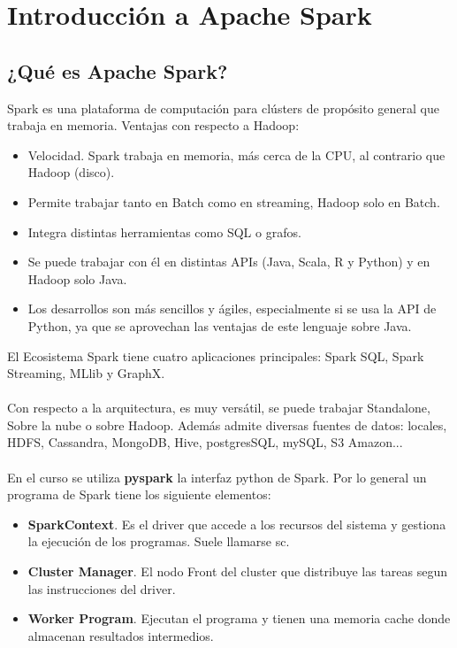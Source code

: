 \section{Introducción a Apache Spark}
\subsection{¿Qué es Apache Spark?}
Spark es una plataforma de computación para clústers de propósito general que trabaja en memoria.
Ventajas con respecto a Hadoop:
\begin{itemize}
	\item Velocidad. Spark trabaja en memoria, más cerca de la CPU, al contrario que Hadoop (disco).
	\item Permite trabajar tanto en Batch como en streaming, Hadoop solo en Batch.
	\item Integra distintas herramientas como SQL o grafos.
	\item Se puede trabajar con él en distintas APIs (Java, Scala, R y Python) y en Hadoop solo Java.
	\item Los desarrollos son más sencillos y ágiles, especialmente si se usa la API de Python, ya que se aprovechan las ventajas de este lenguaje sobre Java.
\end{itemize}
El Ecosistema Spark tiene cuatro aplicaciones principales: Spark SQL, Spark Streaming, MLlib y GraphX.\\\\
Con respecto a la arquitectura, es muy versátil, se puede trabajar Standalone, Sobre la nube o sobre Hadoop. Además admite diversas fuentes de datos: locales, HDFS, Cassandra, MongoDB, Hive, postgresSQL, mySQL, S3 Amazon...\\\\
En el curso se utiliza \textbf{pyspark} la interfaz python de Spark. Por lo general un programa de Spark tiene los siguiente elementos:
\begin{itemize}
	\item \textbf{SparkContext}. Es el driver que accede a los recursos del sistema y gestiona la ejecución de los programas. Suele llamarse sc.
	\item \textbf{Cluster Manager}. El nodo Front del cluster que distribuye las tareas segun las instrucciones del driver.
	\item \textbf{Worker Program}. Ejecutan el programa y tienen una memoria cache donde almacenan resultados intermedios.
\end{itemize}
